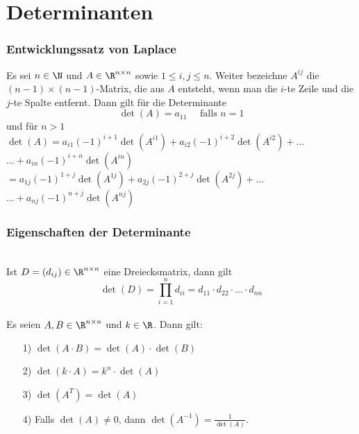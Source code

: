\section{Determinanten}
%
%
\begin{frame}\frametitle{Entwicklungssatz von Laplace}
Es sei $n \in \N$ und  $A \in \R^{n\times n}$ sowie $1\le i,j \le n$. Weiter bezeichne $A^{ij}$ die $(n-1)\times(n-1)$-Matrix, die aus $A$ entsteht, wenn man die $i$-te Zeile und die $j$-te Spalte entfernt. Dann gilt für die Determinante
$$\det(A)=a_{11} \quad \text{ falls } n=1$$ 
und für $n>1$
\vfill
$\det(A)=a_{i1}(-1)^{i+1}\det(A^{i1})+a_{i2}(-1)^{i+2}\det(A^{i2})+...$\\ \vspace{1mm}
\hspace{21mm}$...+a_{in}(-1)^{i+n}\det(A^{in})$\\\vspace{3mm}
\hspace{11.5mm}$=a_{1j}(-1)^{1+j}\det(A^{1j})+a_{2j}(-1)^{2+j}\det(A^{2j})+...$\\ \vspace{1mm}
\hspace{21mm}$...+a_{nj}(-1)^{n+j}\det(A^{nj})$\\\vspace{3mm}
\end{frame}
%
%
\begin{frame}\frametitle{Eigenschaften der Determinante}
\\
Ist $D=(d_{ij}) \in \R^{n\times n}$ eine Dreiecksmatrix, dann gilt
$$
\det(D)=\prod_{i=1}^n d_{ii} = d_{11} \cdot d_{22} \cdot ... \cdot d_{nn}
$$
\vfill
{}\\
Es seien $A,B \in \R^{n\times n}$ und $k \in \R$. Dann gilt: \vfill
\begin{itemize}
\item[1)] $\det(A\cdot B)=\det(A) \cdot \det (B)$
\item[2)] $\det(k\cdot A)=k^n\cdot \det(A)$
\item[3)] $\det(A^T)=\det(A)$
\item[4)] Falls $\det(A)\ne0$, dann $\det(A^{-1})=\frac{1}{\det(A)}$.
\end{itemize}
\end{frame}
%
%
